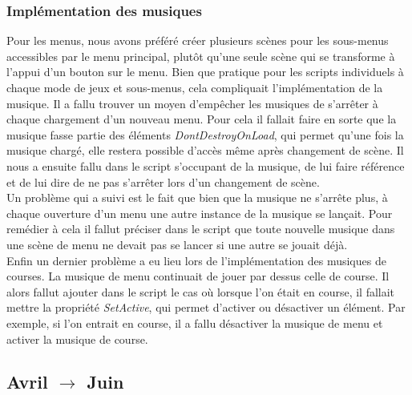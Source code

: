 \documentclass[a4paper,12pt]{article}
\begin{document}
            \subsubsection{Implémentation des musiques}
                Pour les menus, nous avons préféré créer plusieurs scènes pour les sous-menus accessibles
                par le menu principal, plutôt qu'une seule scène qui se transforme à l'appui d'un 
                bouton sur le menu.
                Bien que pratique pour les scripts individuels à chaque mode de jeux et sous-menus,
                cela compliquait l'implémentation de la musique. Il a fallu trouver un moyen d'empêcher
                les musiques de s'arrêter à chaque chargement d'un nouveau menu. Pour cela il
                fallait faire en sorte que la musique fasse partie des éléments
                \textit{DontDestroyOnLoad}, qui permet qu'une fois la musique chargé, elle restera 
                possible d'accès
                même après changement de scène. Il nous a ensuite fallu dans le script s'occupant de la 
                musique, de lui faire référence et de lui dire de ne pas s'arrêter lors d'un changement
                de scène.\\
                Un problème qui a suivi est le fait que bien que la musique ne s'arrête plus, à chaque
                ouverture d'un menu une autre instance de la musique se lançait. Pour remédier à cela il
                fallut préciser dans le script que toute nouvelle musique dans une scène de menu ne
                devait pas se lancer si une autre se jouait déjà.\\
                Enfin un dernier problème a eu lieu lors de l'implémentation des musiques de courses. La
                musique de menu continuait de jouer par dessus celle de course. Il alors fallut
                ajouter dans le script le cas où lorsque l'on était en course, il fallait mettre la 
                propriété \textit{SetActive}, qui permet d'activer ou désactiver un élément. Par 
                exemple, si l'on entrait en course, il a fallu désactiver la musique de menu et activer 
                la musique de course.
        
        \clearpage
        \subsection{Avril $\to$ Juin}
    
\end{document}
